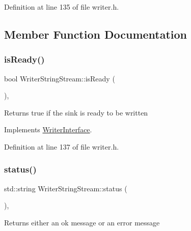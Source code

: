 Definition at line 135 of file writer.\+h.



\subsection{Member Function Documentation}
\mbox{\label{classWriterStringStream_aade0855bffddf11f29ed6390b7c088bd}} 
\subsubsection{\texorpdfstring{is\+Ready()}{isReady()}}
{\footnotesize\ttfamily bool Writer\+String\+Stream\+::is\+Ready (\begin{DoxyParamCaption}{ }\end{DoxyParamCaption})\hspace{0.3cm}{\ttfamily [inline]}, {\ttfamily [virtual]}}

\begin{DoxyReturn}{Returns}
true if the sink is ready to be written 
\end{DoxyReturn}


Implements \hyperlink{classWriterInterface_ada0c58dbea3bc216a1a687b070f2a924}{Writer\+Interface}.



Definition at line 137 of file writer.\+h.

\mbox{\label{classWriterStringStream_a2a5fdbd3f4b48f070cc9dd82013df43f}} 
\subsubsection{\texorpdfstring{status()}{status()}}
{\footnotesize\ttfamily std\+::string Writer\+String\+Stream\+::status (\begin{DoxyParamCaption}{ }\end{DoxyParamCaption})\hspace{0.3cm}{\ttfamily [inline]}, {\ttfamily [virtual]}}

\begin{DoxyReturn}{Returns}
either an ok message or an error message 
\end{DoxyReturn}


